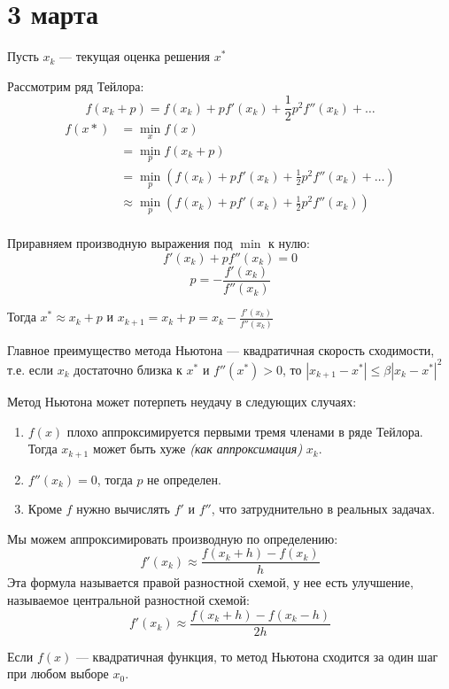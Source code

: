 \chapter{3 марта}

Пусть \(x_k\) --- текущая оценка решения \(x^*\)

Рассмотрим ряд Тейлора:
\[f(x_k + p) = f(x_k) + pf'(x_k) + \frac{1}{2}p^2  f''(x_k) + \dots \]
\begin{align*}
    f(x*) & = \min_x f(x)                                                               \\
          & = \min_p f(x_k + p)                                                         \\
          & = \min_p \left( f(x_k) + pf'(x_k) + \frac{1}{2}p^2 f''(x_k) + \dots \right) \\
          & \approx \min_p \left( f(x_k) + pf'(x_k) + \frac{1}{2}p^2 f''(x_k) \right)   \\
\end{align*}

Приравняем производную выражения под \(\min\) к нулю:
\[f'(x_k) + pf''(x_k) = 0\]
\[p = -\frac{f'(x_k)}{f''(x_k)} \]

Тогда \(x^* \approx x_k + p\) и \(x_{k+1} = x_k + p = x_k - \frac{f'(x_k)}{f''(x_k)} \)

Главное преимущество метода Ньютона --- квадратичная скорость сходимости, т.е. если \(x_k\) достаточно близка к \(x^*\) и \(f''(x^*) > 0\), то \(|x_{k+1} - x^*| \leq \beta|x_k - x^*|^2\)

Метод Ньютона может потерпеть неудачу в следующих случаях:
\begin{enumerate}
    \item \(f(x)\) плохо аппроксимируется первыми тремя членами в ряде Тейлора. Тогда \(x_{k+1}\) может быть хуже \textit{(как аппроксимация)} \(x_k\).
    \item \(f''(x_k) = 0\), тогда \(p\) не определен.
    \item Кроме \(f\) нужно вычислять \(f'\) и \(f''\), что затруднительно в реальных задачах.
\end{enumerate}

Мы можем аппроксимировать производную по определению:
\[f'(x_k) \approx \frac{f(x_k + h) - f(x_k)}{h} \]
Эта формула называется правой разностной схемой, у нее есть улучшение, называемое центральной разностной схемой:
\[f'(x_k) \approx \frac{f(x_k + h) - f(x_k - h)}{2h} \]

Если \(f(x)\) --- квадратичная функция, то метод Ньютона сходится за один шаг при любом выборе \(x_0\).

